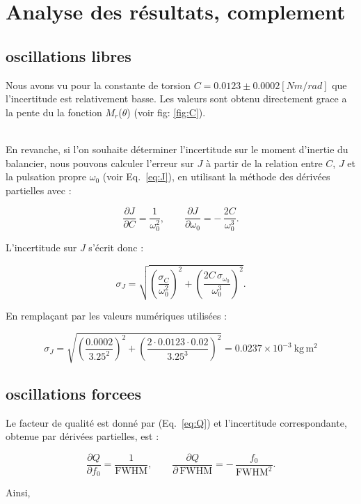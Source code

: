 
\section{Analyse des résultats, complement}

\subsection{oscillations libres}

Nous avons vu pour la constante de torsion $C = 0.0123 \pm 0.0002 [Nm / rad]$ que l'incertitude est relativement basse. Les valeurs sont obtenu directement grace a la pente du la fonction $M_r$($\theta$) (voir fig: \ref{fig:C}).

\\

En revanche, si l'on souhaite déterminer l'incertitude sur le moment d'inertie du balancier,
nous pouvons calculer l'erreur sur $J$ à partir de la relation entre $C$, $J$ et la pulsation propre
$\omega_0$ (voir Eq.~\ref{eq:J}), en utilisant la méthode des dérivées partielles avec :

\[
\frac{\partial J}{\partial C} = \frac{1}{\omega_0^2},
\qquad
\frac{\partial J}{\partial \omega_0}
= -\,\frac{2C}{\omega_0^3}.
\]

L'incertitude sur $J$ s'écrit donc :

\[
\sigma_J = 
\sqrt{
\left( \frac{\sigma_C}{\omega_0^2} \right)^2
+
\left( \frac{2C\,\sigma_{\omega_0}}{\omega_0^3} \right)^2
}.
\]

En remplaçant par les valeurs numériques utilisées :

\[
\sigma_J =
\sqrt{
\left( \frac{0.0002}{3.25^2} \right)^2 +
\left( \frac{2 \cdot 0.0123 \cdot 0.02}{3.25^3} \right)^2
}
= 0.0237 \times 10^{-3}\ \mathrm{kg\,m^2}
\]


\subsection{oscillations forcees}

Le facteur de qualité est donné par (Eq.~\ref{eq:Q}) et l’incertitude correspondante, obtenue par dérivées partielles, est :

\[
\frac{\partial Q}{\partial f_0} = \frac{1}{\mathrm{FWHM}},
\qquad
\frac{\partial Q}{\partial\,\mathrm{FWHM}}
= -\,\frac{f_0}{\mathrm{FWHM}^2}.
\]

Ainsi,

